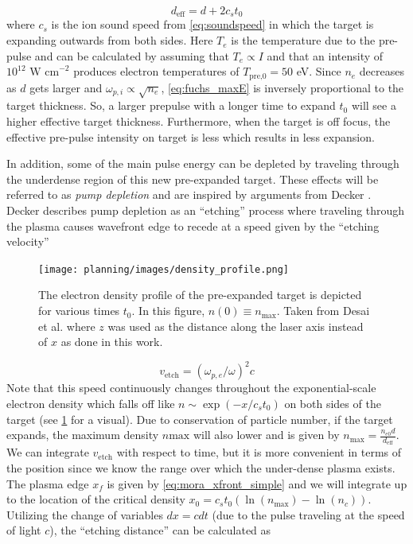 \begin{equation}
	d_\text{eff} = d + 2 c_s t_0 \label{eq:d_eff}
\end{equation}
where $c_s$ is the ion sound speed from \cref{eq:soundspeed} in which the target is expanding outwards from both sides. Here $T_e$ is the temperature due to the pre-pulse and can be calculated by assuming that $T_e \propto I$ and that an intensity of $10^{12} \text{ W cm}^{-2}$ produces electron temperatures of $T_\text{pre,0} = 50$ eV. Since $n_e$ decreases as $d$ gets larger and $\omega_{p,i} \propto \sqrt{n_e}$, \cref{eq:fuchs_maxE} is inversely proportional to the target thickness. So, a larger prepulse with a longer time to expand $t_0$ will see a higher effective target thickness. Furthermore, when the target is off focus, the effective pre-pulse intensity on target is less which results in less expansion.

In addition, some of the main pulse energy can be depleted by traveling through the underdense region of this new pre-expanded target. These effects will be referred to as \emph{pump depletion} and are inspired by arguments from Decker \cite{Decker_1996_PoP}. Decker describes pump depletion as an ``etching'' process where traveling through the plasma causes wavefront edge to recede at a speed given by the ``etching velocity'' 

\begin{figure}
	\centering 
	\texttt{[image: planning/images/density\_profile.png]}
	\caption{The electron density profile of the pre-expanded target is depicted for various times $t_0$. In this figure, $n(0) \equiv n_\text{max}$. Taken from Desai et al. \cite{Desai_2025_APL} where $z$ was used as the distance along the laser axis instead of $x$ as done in this work. }
	\label{fig:density_profile}
\end{figure}
\begin{equation}
	v_\text{etch} = (\omega_{p,e}/\omega)^2 c \label{eq:vetch}
\end{equation}
Note that this speed continuously changes throughout the exponential-scale electron density which falls off like $n \sim \exp(-x/c_s t_0)$ on both sides of the target (see \cref{fig:density_profile} for a visual). Due to conservation of particle number, if the target expands, the maximum density $n\text{max}$ will also lower and is given by $n_\text{max} = \frac{n_{e0} d}{d_\text{eff}}$. We can integrate $v_\text{etch}$ with respect to time, but it is more convenient in terms of the position since we know the range over which the under-dense plasma exists. The plasma edge $x_f$ is given by \cref{eq:mora_xfront_simple} and we will integrate up to the location of the critical density $x_0 = c_s t_0 (\ln(n_\text{max}) - \ln(n_c))$. Utilizing the change of variables $dx = c dt$ (due to the pulse traveling at the speed of light $c$), the ``etching distance'' can be calculated as \cite{Desai_2025_APL} 

